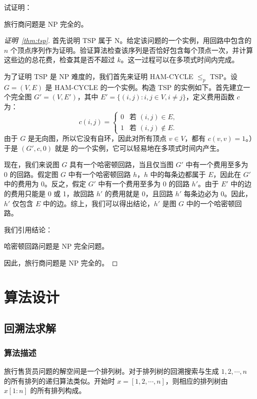 试证明：
\begin{theorem}
    旅行商问题是 NP 完全的。\label{thm:tsp}
\end{theorem}
\begin{proof}[证明~\autoref{thm:tsp}]
首先说明 TSP 属于 N。给定该问题的一个实例，用回路中包含的 $n$ 个顶点序列作为证明。验证算法检查该序列是否恰好包含每个顶点一次，并计算这些边的总花费，检查其是否不超过 $k$。这一过程可以在多项式时间内完成。

为了证明 TSP 是 NP 难度的，我们首先来证明 HAM-CYCLE $\leq_p$ TSP。设 $G = (V, E)$ 是 HAM-CYCLE 的一个实例。构造 TSP 的实例如下。首先建立一个完全图 $G' = (V, E')$，其中 $E' = \{(i, j) : i, j \in V, i \neq j\}$，定义费用函数 $c$ 为：
\[
c(i, j) =
\begin{cases} 
0 & \text{若 } (i, j) \in E, \\
1 & \text{若 } (i, j) \notin E.
\end{cases}
\]
由于 $G$ 是无向图，所以它没有自环，因此对所有顶点 $v \in V$，都有 $c(v, v) = 1$。）于是 $(G', c, 0)$ 就是  的一个实例，它可以轻易地在多项式时间内产生。

现在，我们来说图 $G$ 具有一个哈密顿回路，当且仅当图 $G'$ 中有一个费用至多为 0 的回路。假定图 $G$ 中有一个哈密顿回路 $h$，$h$ 中的每条边都属于 $E$，因此在 $G'$ 中的费用为 0。反之，假定 $G'$ 中有一个费用至多为 0 的回路 $h'$。由于 $E'$ 中的边的费用只能是 0 或 1，故回路 $h'$ 的费用就是 0，且回路 $h'$ 每条边必为 0。因此，$h'$ 仅包含 $E$ 中的边。综上，我们可以得出结论，$h'$ 是图 $G$ 中的一个哈密顿回路。

我们引用结论：
\begin{theorem}
    哈密顿回路问题是 NP 完全问题。
\end{theorem}
因此，旅行商问题是 NP 完全的。
\end{proof}

\section{算法设计}

\subsection{回溯法求解}

\subsubsection{算法描述}

旅行售货员问题的解空间是一个排列树。对于排列树的回溯搜索与生成 $1, 2, \cdots, n$ 的所有排列的递归算法类似。开始时 $x = [1, 2, \cdots, n]$，则相应的排列树由 $x[1:n]$ 的所有排列构成。

